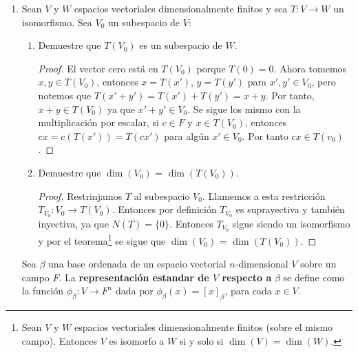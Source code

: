 \documentclass[letterpaper]{article}
\begin{document}
\begin{enumerate}
\item Sean $V$ y $W$ espacios vectoriales dimensionalmente finitos y sea $T : V \to W$ un isomorfismo. Sea
$V_0$ un subespacio de $V$:
\begin{enumerate}[label=(\alph*)]
    \item Demuestre que $T(V_0)$ es un subespacio de $W$.
    \begin{proof}
    El vector cero está en $T(V_0)$ porque $T(0) = 0$. Ahora tomemos $x, y \in T(V_0)$, entonces $x = T(x')$,
    $y = T(y')$ para $x', y' \in V_0$, pero notemos que $T(x' + y') = T(x') + T(y') = x + y$. Por tanto,
    $x + y \in T(V_0)$ ya que $x' + y' \in V_0$. Se sigue los mismo con la multiplicación por escalar, si
    $c \in F$ y $x \in T(V_0)$, entonces $cx = c(T(x')) = T(cx')$ para algún $x' \in V_0$. Por tanto
    $cx \in T(v_0)$.
    \end{proof}

    \item Demuestre que $\dim(V_0)$ = $\dim(T(V_0))$.
    \begin{proof}
    Restrinjamos $T$ al subespacio $V_0$. Llamemos a esta restricción $T_{V_0} : V_0 \to T(V_0)$. Entonces
    por definición $T_{V_0}$ es suprayectiva y también inyectiva, ya que $N(T) = \{ 0 \}$. Entonces
    $T_{V_0}$ sigue siendo un isomorfismo y por el teorema\footnote{
        Sean $V$ y $W$ espacios vectoriales dimensionalmente finitos (sobre el mismo campo). Entonces $V$ es
        isomorfo a $W$ si y solo si $\dim(V) = \dim(W)$.
    } se sigue que $\dim(V_0)$ = $\dim(T(V_0))$.
    \end{proof}
    
\end{enumerate}

\begin{definition*}
Sea $\beta$ una base ordenada de un espacio vectorial $n$-dimensional $V$ sobre un campo $F$. La
\textbf{representación estandar de $V$ respecto a} $\beta$ se define como la función $\phi_\beta : V \to F^n$
dada por $\phi_\beta(x) = [x]_\beta$, para cada $x \in V$.
\end{definition*}


\end{enumerate}
\end{document}
